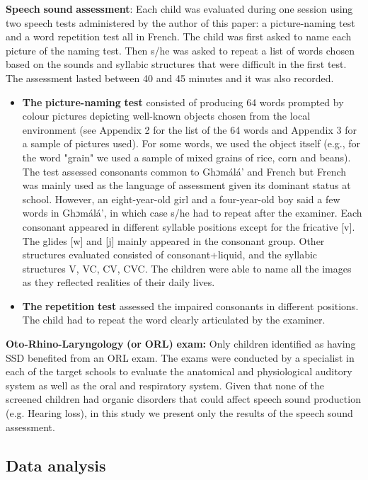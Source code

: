 \documentclass[output=paper,newtxmath,modfonts,nonflat,draftmode]{langsci/langscibook}
\begin{document}
\textbf{Speech} \textbf{sound} \textbf{assessment}: Each child was evaluated during one session using two speech tests administered by the author of this paper: a picture-naming test and a word repetition test all in French. The child was first asked to name each picture of the naming test. Then s/he was asked to repeat a list of words chosen based on the sounds and syllabic structures that were difficult in the first test. The assessment lasted between 40 and 45 minutes and it was also recorded.

\begin{itemize}
\item  \textbf{The} \textbf{picture-naming} \textbf{test} consisted of producing 64 words prompted by colour pictures depicting well-known objects chosen from the local environment (see Appendix 2 for the list of the 64 words and Appendix 3 for a sample of pictures used). For some words, we used the object itself (e.g., for the word "grain" we used a sample of mixed grains of rice, corn and beans). The test assessed consonants common to Ghɔmálá’ and French but French was mainly used as the language of assessment given its dominant status at school. However, an eight-year-old girl and a four-year-old boy said a few words in Ghɔmálá’, in which case s/he had to repeat after the examiner. Each consonant appeared in different syllable positions except for the fricative [v]. The glides [w] and [j] mainly appeared in the consonant group. Other structures evaluated consisted of consonant+liquid, and the syllabic structures V, VC, CV, CVC. The children were able to name all the images as they reflected realities of their daily lives.
\item  \textbf{The} \textbf{repetition} \textbf{test} assessed the impaired consonants in different positions. The child had to repeat the word clearly articulated by the examiner.
\end{itemize}

\textbf{Oto-Rhino-Laryngology} \textbf{(or} \textbf{ORL)} \textbf{exam:} Only children identified as having SSD benefited from an ORL exam. The exams were conducted by a specialist in each of the target schools to evaluate the anatomical and physiological auditory system as well as the oral and respiratory system. Given that none of the screened children had organic disorders that could affect speech sound production (e.g. Hearing loss), in this study we present only the results of the speech sound assessment.

\subsection{Data analysis} %
\end{document}
